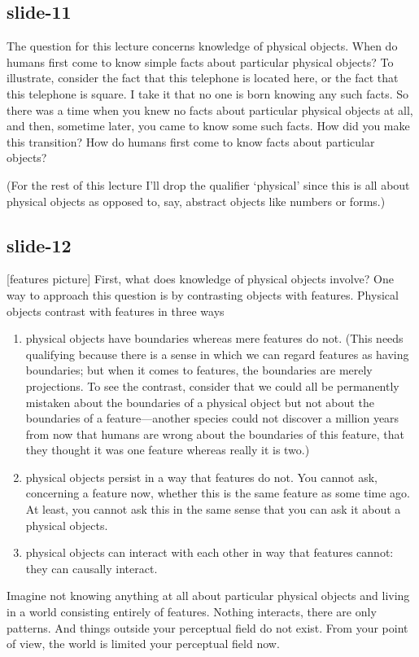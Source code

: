 \documentclass[12pt,\papersize]{extarticle}
\begin{document}
\subsection{slide-11}
The question for this lecture concerns knowledge of physical objects.
When do humans first come to know simple facts about particular physical objects?
To illustrate, consider the fact that this telephone is located here,
or the fact that this telephone is square.
I take it that no one is born knowing any such facts.
So there was a time when you knew no facts about particular physical objects at all,
and then, sometime later, you came to know some such facts.
How did you make this transition?
How do humans first come to know facts about particular objects?
 
(For the rest of this lecture 
I'll drop the qualifier `physical' since this is all about physical objects as opposed to, 
say, abstract objects like numbers or forms.)
 
\subsection{slide-12}
[features picture]
First, what does knowledge of physical objects involve?
One way to approach this question is by contrasting objects with features.
Physical objects contrast with features in three ways
%
\begin{enumerate}
%
\item physical objects have boundaries whereas mere features do not. (This needs qualifying 
because there is a sense in which we can regard features as having boundaries; but when it 
comes to 
features, the boundaries are merely projections.  To see the contrast, consider that we could 
all be permanently mistaken about the boundaries of a physical object but not about the 
boundaries of a feature---another species could not discover a million years from now that 
humans are wrong about the boundaries of this feature, that they thought it was one feature
whereas really it is two.)
%
\item physical objects persist in a way that features do not.  You cannot ask, concerning a 
feature now, whether this is the same feature as some time ago.  At least, you cannot ask this
in the same sense that you can ask it about a physical objects.
%
\item physical objects can interact with each other in way that features cannot: they
can causally interact.
%
\end{enumerate}
%
Imagine not knowing anything at all about particular physical objects and living in a world
consisting entirely of features.  Nothing interacts, there are only patterns.
And things outside your perceptual field do not exist.
From your point of view, the world is limited your perceptual field now.
 
\end{document}
